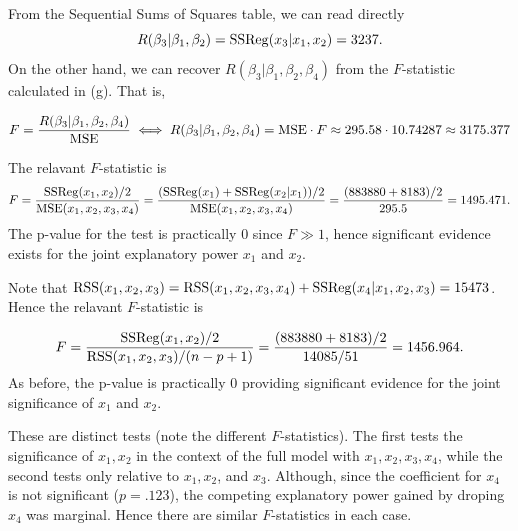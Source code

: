 \documentclass{homework}
\begin{document}
\begin{longproblem}

From the Sequential Sums of Squares table, we can read directly
$$
  R(\beta_3|\beta_1,\beta_2) = \mathrm{SSReg}(x_3|x_1,x_2) = 3237.
$$
On the other hand, we can recover $R(\beta_3|\beta_1,\beta_2,\beta_4)$ from the
$F$-statistic calculated in (g). That is, 

$$
F = \frac{R(\beta_3|\beta_1,\beta_2,\beta_4)}{\mathrm{MSE}} \iff R(\beta_3|\beta_1,\beta_2,\beta_4) = \mathrm{MSE}\cdot F \approx 295.58\cdot10.74287\approx3175.377
$$

\newpage
{}

The relavant $F$-statistic is
$$
  F = \frac{\mathrm{SSReg}(x_1,x_2)/2}{\mathrm{MSE}(x_1,x_2,x_3,x_4)}= \frac{(\mathrm{SSReg}(x_1) + \mathrm{SSReg}(x_2|x_1))/2}{\mathrm{MSE}(x_1,x_2,x_3,x_4)} = \frac{(883880+8183)/2}{295.5} = 1495.471.
$$
The p-value for the test is practically 0 since $F \gg 1$, hence significant evidence exists for the joint explanatory power $x_1$ and $x_2$.  


Note that $\mathrm{RSS}(x_1,x_2,x_3) = \mathrm{RSS}(x_1,x_2,x_3,x_4) + \mathrm{SSReg}(x_4|x_1,x_2,x_3) = 15473$.  Hence the relavant $F$-statistic is

$$
  F = \frac{\mathrm{SSReg}(x_1,x_2)/2}{\mathrm{RSS}(x_1,x_2,x_3)/(n-p+1)} = \frac{(883880+8183)/2}{14085/51} = 1456.964.
$$
As before, the p-value is practically 0 providing significant evidence for the joint significance of $x_1$ and $x_2$.


These are distinct tests (note the different $F$-statistics). The first tests the significance of
$x_1,x_2$ in the context of the full model with $x_1,x_2,x_3,x_4$,
while the second tests only relative to $x_1,x_2$, and $x_3$.  Although, since the coefficient for $x_4$ is not significant ($p = .123$), the competing explanatory power gained by droping $x_4$ was marginal. Hence there are similar $F$-statistics in each case.




\end{longproblem}
\end{document}
